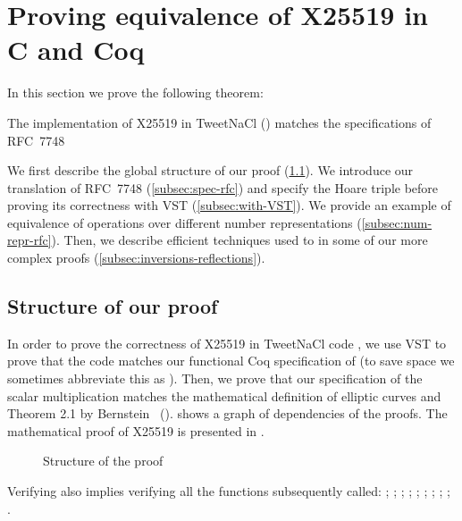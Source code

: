 \section{Proving equivalence of X25519 in C and Coq}
\label{sec:C-Coq-RFC}

In this section we prove the following theorem:
\begin{theorem}
\label{thm:VST-RFC}
The implementation of X25519 in TweetNaCl () matches
the specifications of RFC~7748~\cite{rfc7748}
\end{theorem}

We first describe the global structure of our proof (\ref{subsec:proof-structure}).
We introduce our translation of RFC~7748 (\ref{subsec:spec-rfc}) and specify
the Hoare triple before proving its correctness with VST (\ref{subsec:with-VST}).
We provide an example of equivalence of operations over different number
representations (\ref{subsec:num-repr-rfc}). Then, we describe efficient techniques
used to in some of our more complex proofs (\ref{subsec:inversions-reflections}).





\subsection{Structure of our proof}
\label{subsec:proof-structure}

In order to prove the correctness of X25519 in TweetNaCl code ,
we use VST to prove that the code matches our functional Coq specification of 
(to save space we sometimes abbreviate this as ). Then, we prove that
our specification of the scalar multiplication matches the mathematical definition
of elliptic curves and Theorem 2.1 by Bernstein~\cite{Ber06} ().
 shows a graph of dependencies of the proofs.
The mathematical proof of X25519 is presented in .
\begin{figure}[h]
  \centering
  
  \caption{Structure of the proof}
  \label{tikz:ProofOverview}
\end{figure}

Verifying  also implies verifying all the functions
subsequently called: ; ; ; ;
; ; ; ; ;
.


